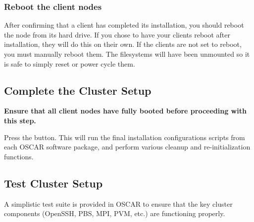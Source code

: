 \subsubsection{Reboot the client nodes}

After confirming that a client has completed its installation, you
should reboot the node from its hard drive. If you chose to have your
clients reboot after installation, they will do this on their
own. If the clients are not set to reboot, you must manually
reboot them. The filesystems will have been unmounted so it is safe
to simply reset or power cycle them.



\subsection{Complete the Cluster Setup}
\label{det:complete-cluster-setup}

{\bf Ensure that all client nodes have fully booted before proceeding
  with this step.}

Press the  button.  This will run the
final installation configurations scripts from each OSCAR software
package, and perform various cleanup and re-initialization functions.



\subsection{Test Cluster Setup}
\label{det:test-cluster}

A simplistic test suite is provided in OSCAR to ensure that the key
cluster components (OpenSSH, PBS, MPI, PVM, etc.) are functioning
properly.

